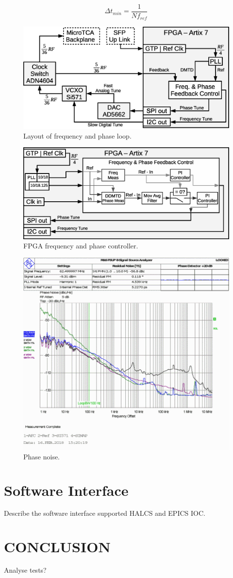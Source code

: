 \documentclass[a4paper,
               biblatex,      %
               ]{jacow}
\begin{document}
\[\Delta t_{min}=\frac{1}{Nf_{ref}}\]

\begin{figure}[!htb]
   \centering
   \includegraphics*[width=0.8\columnwidth]{AFCRefClockLoop}
   \caption{Layout of frequency and phase loop.}
   \label{fig:AFCRefClockLoop}
\end{figure}

\begin{figure}[!htb]
   \centering
   \includegraphics*[width=0.8\columnwidth]{AFCFPGADMTD}
   \caption{FPGA frequency and phase controller.}
   \label{fig:AFCFPGADMTD}
\end{figure}

\begin{figure}[!htb]
   \centering
   \includegraphics*[width=0.8\columnwidth]{AFC_TIMING_SI571}
   \caption{Phase noise.}
   \label{fig:AFCPhaseNoise}
\end{figure}

\section{Software Interface}
Describe the software interface supported HALCS and EPICS IOC.

\section{CONCLUSION}

Analyse tests?

\printbibliography
\newpage
\end{document}
